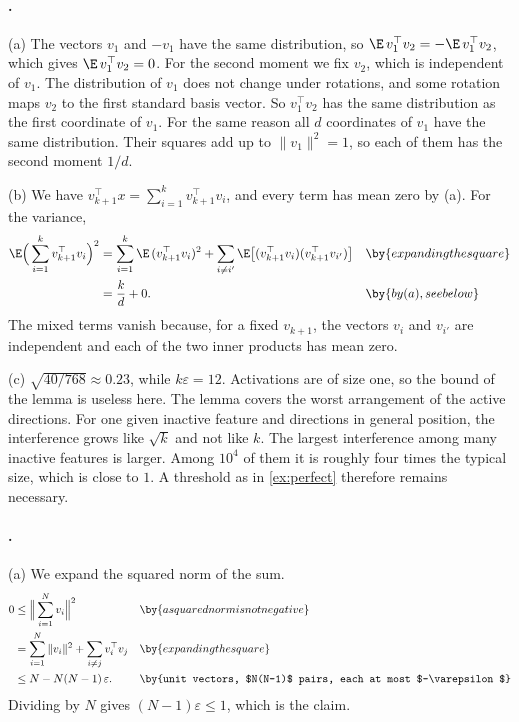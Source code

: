 {\paragraph{.}
(a) The vectors $v_1$ and $-v_1$ have the same distribution, so $\E\,v_1^\top v_2=-\E\,v_1^\top v_2$, which gives
$\E\,v_1^\top v_2=0$. For the second moment we fix $v_2$, which is independent of $v_1$. The distribution of $v_1$
does not change under rotations, and some rotation maps $v_2$ to the first standard basis vector. So
$v_1^\top v_2$ has the same distribution as the first coordinate of $v_1$. For the same reason all $d$ coordinates
of $v_1$ have the same distribution. Their squares add up to $\|v_1\|^2=1$, so each of them has the second moment
$1/d$.

(b) We have $v_{k+1}^\top x=\sum_{i=1}^{k}v_{k+1}^\top v_i$, and every term has mean zero by (a). For the variance,
\begin{align*}
\E\Big(\sum_{i=1}^{k}v_{k+1}^\top v_i\Big)^2
&= \sum_{i=1}^{k}\E\,(v_{k+1}^\top v_i)^2+\sum_{i\ne i'}\E\big[(v_{k+1}^\top v_i)(v_{k+1}^\top v_{i'})\big] && \by{expanding the square}\\
&= \frac kd+0. && \by{by (a), see below}
\end{align*}
The mixed terms vanish because, for a fixed $v_{k+1}$, the vectors $v_i$ and $v_{i'}$ are independent and each of
the two inner products has mean zero.

(c) $\sqrt{40/768}\approx0.23$, while $k\varepsilon=12$. Activations are of size one, so the bound of the lemma is
useless here. The lemma covers the worst arrangement of the active directions. For one given inactive feature
and directions in general position, the interference grows like $\sqrt k$ and not like $k$. The largest
interference among many inactive features is larger. Among $10^4$ of them it is roughly four times the typical
size, which is close to $1$. A threshold as in \cref{ex:perfect} therefore remains necessary.

\paragraph{.}
(a) We expand the squared norm of the sum.
\begin{align*}
0 &\le \Big\|\sum_{i=1}^{N}v_i\Big\|^2 && \by{a squared norm is not negative}\\
&= \sum_{i=1}^{N}\|v_i\|^2+\sum_{i\ne j}v_i^\top v_j && \by{expanding the square}\\
&\le N-N(N-1)\,\varepsilon. && \by{unit vectors, $N(N-1)$ pairs, each at most $-\varepsilon$}
\end{align*}
Dividing by $N$ gives $(N-1)\varepsilon\le1$, which is the claim.

}

